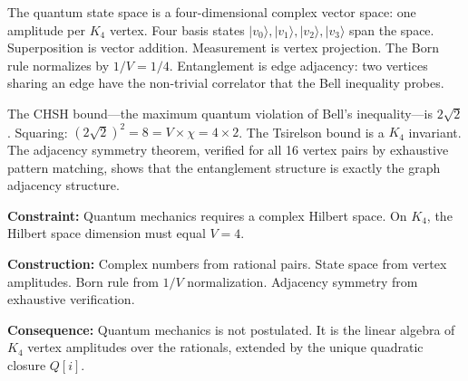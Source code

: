 \documentclass[11pt,a4paper]{book}
\def\mathbb#1{#1}%
\begin{document}
The quantum state space is a four-dimensional complex vector space: one amplitude per $K_4$ vertex. Four basis states $|v_0\rangle, |v_1\rangle, |v_2\rangle, |v_3\rangle$ span the space. Superposition is vector addition. Measurement is vertex projection. The Born rule normalizes by $1/V = 1/4$. Entanglement is edge adjacency: two vertices sharing an edge have the non-trivial correlator that the Bell inequality probes.

The CHSH bound---the maximum quantum violation of Bell's inequality---is $2\sqrt{2}$. Squaring: $(2\sqrt{2})^2 = 8 = V \times \chi = 4 \times 2$. The Tsirelson bound is a $K_4$ invariant. The adjacency symmetry theorem, verified for all 16 vertex pairs by exhaustive pattern matching, shows that the entanglement structure is exactly the graph adjacency structure.

\textbf{Constraint:} Quantum mechanics requires a complex Hilbert space. On $K_4$, the Hilbert space dimension must equal $V = 4$.

\textbf{Construction:} Complex numbers from rational pairs. State space from vertex amplitudes. Born rule from $1/V$ normalization. Adjacency symmetry from exhaustive verification.

\textbf{Consequence:} Quantum mechanics is not postulated. It is the linear algebra of $K_4$ vertex amplitudes over the rationals, extended by the unique quadratic closure $\mathbb{Q}[i]$.
\end{document}

